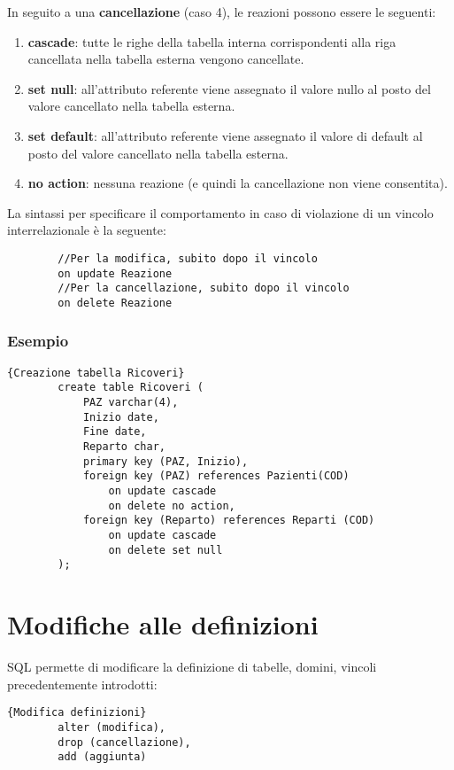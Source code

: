 In seguito a una \textbf{cancellazione} (caso 4), le reazioni possono essere le seguenti:
    \begin{enumerate}
        \item{\textbf{cascade}: tutte le righe della tabella interna corrispondenti alla riga cancellata nella tabella esterna vengono cancellate.}
        \item{\textbf{set null}: all'attributo referente viene assegnato il valore nullo al posto del valore cancellato nella tabella esterna.}
        \item{\textbf{set default}: all'attributo referente viene assegnato il valore di default al posto del valore cancellato nella tabella esterna.}
        \item{\textbf{no action}: nessuna reazione (e quindi la cancellazione non viene consentita).}
    \end{enumerate}
La sintassi per specificare il comportamento in caso di violazione di un vincolo interrelazionale è la seguente:
    \begin{lstlisting}
        //Per la modifica, subito dopo il vincolo
        on update Reazione
        //Per la cancellazione, subito dopo il vincolo
        on delete Reazione
    \end{lstlisting}

\subsubsection{Esempio}
    \begin{lstlisting}{Creazione tabella Ricoveri}
        create table Ricoveri (
            PAZ varchar(4),
            Inizio date,
            Fine date,
            Reparto char,
            primary key (PAZ, Inizio),
            foreign key (PAZ) references Pazienti(COD)
                on update cascade
                on delete no action,
            foreign key (Reparto) references Reparti (COD)
                on update cascade
                on delete set null
        );
    \end{lstlisting}

\section{Modifiche alle definizioni}
SQL permette di modificare la definizione di tabelle, domini, vincoli precedentemente introdotti:
    \begin{lstlisting}{Modifica definizioni}
        alter (modifica),
        drop (cancellazione),
        add (aggiunta)
    \end{lstlisting}
